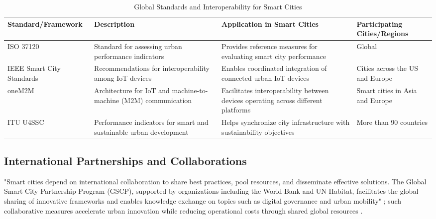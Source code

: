 \documentclass[pdflatex,sn-mathphys-num]{sn-jnl}%
\theoremstyle{thmstyleone}%
\theoremstyle{thmstyletwo}%
\theoremstyle{thmstylethree}%
\begin{document}
\begin{table}[!t]
\caption{Global Standards and Interoperability for Smart Cities}
\label{tab:smartstandards}
\centering
\scriptsize
\setlength{\tabcolsep}{3pt}
\renewcommand{\arraystretch}{1.15}

\begin{tabularx}{\textwidth}{|l|>{\raggedright\arraybackslash}X|>{\raggedright\arraybackslash}X|>{\raggedright\arraybackslash}X|}
\hline
\textbf{Standard/Framework} &
\textbf{Description} &
\textbf{Application in Smart Cities} &
\textbf{Participating Cities/Regions} \\
\hline

ISO 37120 &
Standard for assessing urban performance indicators &
Provides reference measures for evaluating smart city performance &
Global \\
\hline

IEEE Smart City Standards &
Recommendations for interoperability among IoT devices &
Enables coordinated integration of connected urban IoT devices &
Cities across the US and Europe \\
\hline

oneM2M &
Architecture for IoT and machine-to-machine (M2M) communication &
Facilitates interoperability between devices operating across different platforms &
Smart cities in Asia and Europe \\
\hline

ITU U4SSC &
Performance indicators for smart and sustainable urban development &
Helps synchronize city infrastructure with sustainability objectives &
More than 90 countries \\
\hline

\end{tabularx}
\end{table}

\subsection{International Partnerships and Collaborations}
"Smart cities depend on international collaboration to share best practices, pool resources, and disseminate effective solutions. The Global Smart City Partnership Program (GSCP), supported by organizations including the World Bank and UN-Habitat, facilitates the global sharing of innovative frameworks and enables knowledge exchange on topics such as digital governance and urban mobility" \cite{r94}; such collaborative measures accelerate urban innovation while reducing operational costs through shared global resources \cite{r86}.
\end{document}
